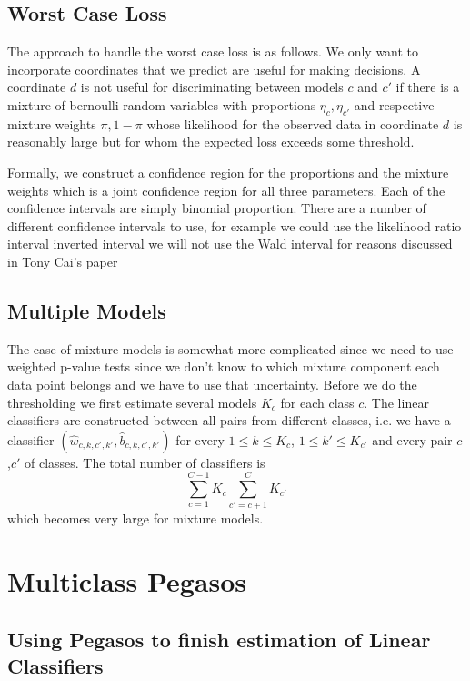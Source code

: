 \documentclass{article}
\begin{document}
\subsection{Worst Case Loss}

The approach to handle the worst case loss is as follows.
We only want to incorporate coordinates that we predict are 
useful for making decisions.  A coordinate $d$ is not useful
for discriminating between models $c$ and $c'$ if there is
a mixture of bernoulli random variables with proportions
$\eta_c,\eta_{c'}$ and respective mixture weights $\pi,1-\pi$
whose likelihood for the observed data in coordinate
$d$ is reasonably large but for whom the expected loss exceeds
some threshold.

Formally, we construct a confidence region for the proportions
and the mixture weights which is a joint confidence region
for all three parameters.  Each of the confidence intervals
are simply binomial proportion. There are a number of different
confidence intervals to use, for example we could
use the likelihood ratio interval inverted interval
we will not use the Wald interval for reasons discussed in 
Tony Cai's paper

\subsection{Multiple Models}

The case of mixture models is somewhat more complicated since
we need to use weighted p-value tests since we don't know
to which mixture component each data point belongs and
we have to use that uncertainty.  Before we do the thresholding
we first estimate several models $K_c$ for each class $c$.
The linear classifiers are constructed between all pairs from
different classes, i.e. we have a classifier $(\hat{w}_{c,k,c',k'},\hat{b}_{c,k,c',k'})$
for every $1\leq k\leq K_c$, $1\leq k'\leq K_{c'}$ and every pair
$c$,$c'$ of classes. The total number of classifiers is
\begin{equation}
\sum_{c=1}^{C-1} K_c \sum_{c'=c+1}^C K_{c'}
\end{equation}
which becomes very large for mixture models.



\section{ Multiclass Pegasos}

\subsection{Using Pegasos to finish estimation of Linear Classifiers}
\end{document}
